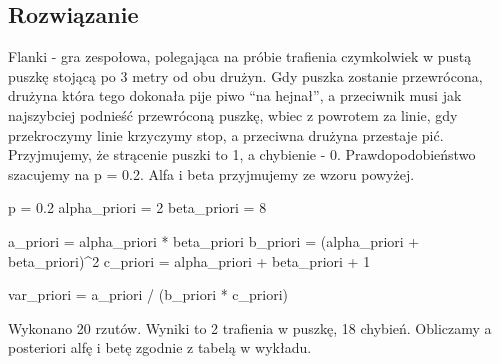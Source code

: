 \documentclass[
]{article}
\newenvironment{Shaded}{\begin{snugshade}}{\end{snugshade}}
\newcommand{\DecValTok}[1]{\textcolor[rgb]{0.00,0.00,0.81}{#1}}
\newcommand{\FloatTok}[1]{\textcolor[rgb]{0.00,0.00,0.81}{#1}}
\newcommand{\NormalTok}[1]{#1}
\newcommand{\OtherTok}[1]{\textcolor[rgb]{0.56,0.35,0.01}{#1}}
\newcommand{\SpecialCharTok}[1]{\textcolor[rgb]{0.00,0.00,0.00}{#1}}
\begin{document}
\hypertarget{rozwiux105zanie-2}{%
\subsection{Rozwiązanie}\label{rozwiux105zanie-2}}

Flanki - gra zespołowa, polegająca na próbie trafienia czymkolwiek w
pustą puszkę stojącą po 3 metry od obu drużyn. Gdy puszka zostanie
przewrócona, drużyna która tego dokonała pije piwo ``na hejnał'', a
przeciwnik musi jak najszybciej podnieść przewróconą puszkę, wbiec z
powrotem za linie, gdy przekroczymy linie krzyczymy stop, a przeciwna
drużyna przestaje pić. Przyjmujemy, że strącenie puszki to 1, a
chybienie - 0. Prawdopodobieństwo szacujemy na p = 0.2. Alfa i beta
przyjmujemy ze wzoru powyżej.

\begin{Shaded}
\begin{Highlighting}[]
\NormalTok{p }\OtherTok{=} \FloatTok{0.2}
\NormalTok{alpha\_priori }\OtherTok{=} \DecValTok{2}
\NormalTok{beta\_priori }\OtherTok{=} \DecValTok{8}

\NormalTok{a\_priori }\OtherTok{=}\NormalTok{ alpha\_priori }\SpecialCharTok{*}\NormalTok{ beta\_priori}
\NormalTok{b\_priori }\OtherTok{=}\NormalTok{ (alpha\_priori }\SpecialCharTok{+}\NormalTok{ beta\_priori)}\SpecialCharTok{\^{}}\DecValTok{2}
\NormalTok{c\_priori }\OtherTok{=}\NormalTok{ alpha\_priori }\SpecialCharTok{+}\NormalTok{ beta\_priori }\SpecialCharTok{+} \DecValTok{1}

\NormalTok{var\_priori }\OtherTok{=}\NormalTok{ a\_priori }\SpecialCharTok{/}\NormalTok{ (b\_priori }\SpecialCharTok{*}\NormalTok{ c\_priori)}
\end{Highlighting}
\end{Shaded}

Wykonano 20 rzutów. Wyniki to 2 trafienia w puszkę, 18 chybień.
Obliczamy a posteriori alfę i betę zgodnie z tabelą w wykładu.
\end{document}
